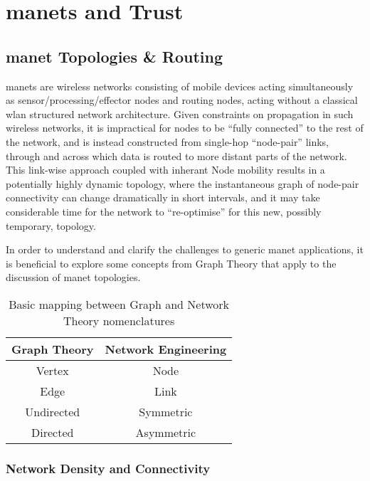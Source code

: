 \chapter{\glspl{manet} and Trust}
\label{ch:trust_background}

\section{\acrlong{manet} Topologies \& Routing}\label{sec:manet_topologies}

\glspl{manet} are wireless networks consisting of mobile devices acting simultaneously as sensor/processing/effector nodes and routing nodes, acting without a classical \gls{wlan} structured network architecture. 
Given constraints on propagation in such wireless networks, it is impractical for nodes to be ``fully connected'' to the rest of the network, and is instead constructed from single-hop ``node-pair'' links, through and across which data is routed to more distant parts of the network.
This link-wise approach coupled with inherant Node mobility results in a potentially highly dynamic topology, where the instantaneous graph of node-pair connectivity can change dramatically in short intervals, and it may take considerable time for the network to ``re-optimise'' for this new, possibly temporary, topology. 

In order to understand and clarify the challenges to generic \gls{manet} applications, it is beneficial to explore some concepts from Graph Theory that apply to the discussion of \gls{manet} topologies. 


\begin{table} 
	\centering
	\begin{tabular}{cc}
		\toprule
		Graph Theory & Network Engineering\\
		\midrule
		Vertex & Node\\
		Edge & Link\\
		Undirected & Symmetric\\
		Directed & Asymmetric\\
		\bottomrule
	\end{tabular}
	\caption{Basic mapping between Graph and Network Theory nomenclatures}
\end{table}

\subsection{Network Density and Connectivity}\label{sec:connectivity}

